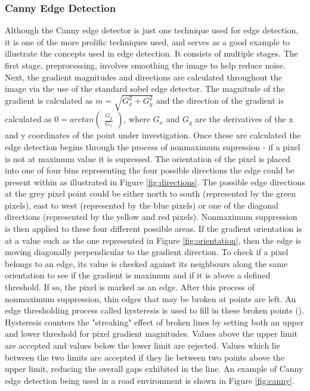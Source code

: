 \documentclass[12pt]{report}
\begin{document}
\subsubsection{Canny Edge Detection}
\begin{flushleft}
Although the Canny edge detector is just one technique used for edge detection, it is one of the more prolific techniques used, and serves as a good example to illustrate the concepts used in edge detection. It consists of multiple stages. The first stage, preprocessing, involves smoothing the image to help reduce noise. Next, the gradient magnitudes and directions are calculated throughout the image via the use of the standard sobel edge detector. The magnitude of the gradient is calculated as $m=\sqrt{G_x^2+G_y^2}$ and the direction of the gradient is calculated as $0=arctan\left(\begin{array}{c}\frac{G_y}{G_x}\end{array}\right)$, where $G_x$ and $G_y$ are the derivatives of the x and y coordinates of the point under investigation. Once these are calculated the edge detection begins through the process of nonmaximum supression - if a pixel is not at maximum value it is supressed. The orientation of the pixel is placed into one of four bins representing the four possible directions the edge could be present within as illustrated in Figure \ref{fig:directions}. The possible edge directions at the grey pixel point could be either north to south (represented by the green pixels), east to west (represented by the blue pixels) or one of the diagonal directions (represented by the yellow and red pixels). Nonmaximum suppression is then applied to these four different possible areas. If the gradient orientation is at a value such as the one represented in Figure \ref{fig:orientation}, then the edge is moving diagonally perpendicular to the gradient direction. To check if a pixel belongs to an edge, its value is checked against its neighbours along the same orientation to see if the gradient is maximum and if it is above a defined threshold. If so, the pixel is marked as an edge. After this process of nonmaximum suppression, thin edges that may be broken at points are left. An edge thresholding process called hysteresis is used to fill in these broken points (\cite{canny1986computational}). Hysteresis counters the "streaking" effect of broken lines by setting both an upper and lower threshold for pixel gradient magnitudes. Values above the upper limit are accepted and values below the lower limit are rejected. Values which lie between the two limits are accepted if they lie between two points above the upper limit, reducing the overall gaps exhibited in the line. An example of Canny edge detection being used in a road environment is shown in Figure \ref{fig:canny}.
\end{flushleft}
\end{document}
